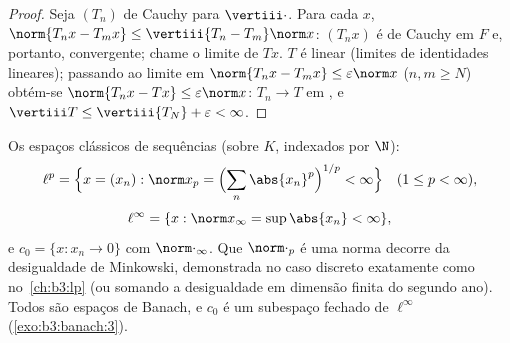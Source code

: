 \begin{proof}
Seja $(T_n)$ de Cauchy para $\vertiii\cdot$. Para cada $x$, $\norm{T_nx - T_mx} \leq \vertiii{T_n - T_m}\norm x$: $(T_nx)$
é de Cauchy em $F$ e, portanto, convergente; chame o limite de
$Tx$. $T$ é linear (limites de identidades lineares); passando ao
limite em $\norm{T_nx - T_mx} \leq \varepsilon\norm x$ ($n, m \geq N$) obtém-se $\norm{T_nx - Tx} \leq \varepsilon\norm x$: $T_n \to T$ em , e $\vertiii T \leq \vertiii{T_N} +
\varepsilon < \infty$.
\end{proof}

\begin{definition}\label{def:b3:banach:lp}
Os espaços clássicos de sequências (sobre $K$, indexados por $\N$):
\[
\ell^p = \Bigl\{x = (x_n) : \norm x_p = \Bigl(\sum_n
\abs{x_n}^p\Bigr)^{1/p} < \infty\Bigr\}\quad (1 \leq p <
\infty),
\]
\[
\ell^\infty = \{x : \norm x_\infty = \sup\abs{x_n} < \infty\},
\]
e $c_0 = \{x : x_n \to 0\}$ com $\norm\cdot_\infty$. Que $\norm\cdot_p$ é uma norma decorre da desigualdade de
Minkowski, demonstrada no caso discreto exatamente como no~\cref{ch:b3:lp} (ou somando a desigualdade em dimensão finita do segundo
ano). Todos são espaços de Banach, e $c_0$ é um subespaço fechado de
$\ell^\infty$ (\cref{exo:b3:banach:3}).
\end{definition}

